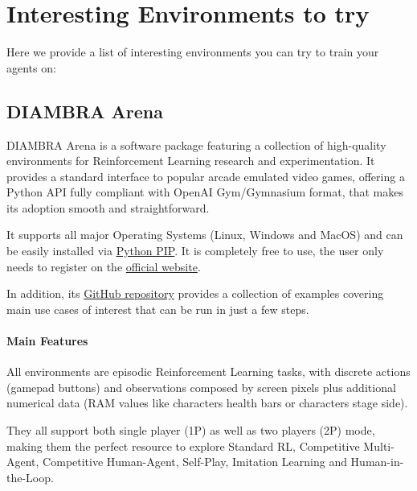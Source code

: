 \documentclass[11pt,a4paper]{article}
\begin{document}
\section{Interesting Environments to try}\label{interesting-environments-to-try}

Here we provide a list of interesting environments you can try to train your agents on:

\subsection{DIAMBRA Arena}\label{diambra-arena}


DIAMBRA Arena is a software package featuring a collection of high-quality environments for Reinforcement Learning research and experimentation. It provides a standard interface to popular arcade emulated video games, offering a Python API fully compliant with OpenAI Gym/Gymnasium format, that makes its adoption smooth and straightforward.

It supports all major Operating Systems (Linux, Windows and MacOS) and can be easily installed via \href{https://pypi.org/project/diambra-arena/}{Python PIP}. It is completely free to use, the user only needs to register on the \href{https://diambra.ai/register/}{official website}.

In addition, its \href{https://github.com/diambra/}{GitHub repository} provides a collection of examples covering main use cases of interest that can be run in just a few steps.

\paragraph{Main Features}\label{main-features}

All environments are episodic Reinforcement Learning tasks, with discrete actions (gamepad buttons) and observations composed by screen pixels plus additional numerical data (RAM values like characters health bars or characters stage side).

They all support both single player (1P) as well as two players (2P) mode, making them the perfect resource to explore Standard RL, Competitive Multi-Agent, Competitive Human-Agent, Self-Play, Imitation Learning and Human-in-the-Loop.
\end{document}
